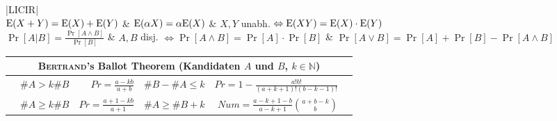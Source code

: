 \begin{tabularx}{\linewidth}{|LICIR|}
	\hline
	 \\
	\hline
	$\text{E}(X + Y) = \text{E}(X) + \text{E}(Y)$ &
	$\text{E}(\alpha X) = \alpha \text{E}(X)$ &
	$X, Y$ unabh. $\Leftrightarrow \text{E}(XY) = \text{E}(X) \cdot \text{E}(Y)$\\
	
	$\Pr[A \vert B] = \frac{\Pr[A \land B]}{\Pr[B]}$ &
	$A, B$ disj. $\Leftrightarrow \Pr[A \land B] = \Pr[A] \cdot \Pr[B]$ &
	$\Pr[A \lor B] = \Pr[A] + \Pr[B] - \Pr[A \land B]$ \\
	\hline
\end{tabularx}
\vfill
\begin{tabularx}{\linewidth}{|Xlr|lrX|}
	\hline
	\multicolumn{6}{|c|}{\textsc{Bertrand}'s Ballot Theorem (Kandidaten $A$ und $B$, $k \in \mathbb{N}$)} \\
	\hline
	& $\#A > k\#B$ & $Pr = \frac{a - kb}{a + b}$ &
	$\#B - \#A \leq k$ & $Pr = 1 - \frac{a!b!}{(a + k + 1)!(b - k - 1)!}$ & \\
	
	& $\#A \geq k\#B$ & $Pr = \frac{a + 1 - kb}{a + 1}$ &
	$\#A \geq \#B + k$ & $Num = \frac{a - k + 1 - b}{a - k + 1} \binom{a + b - k}{b}$ & \\
	\hline
\end{tabularx}
